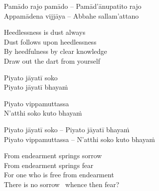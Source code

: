 \begin{verses}
  Pamādo rajo pamādo – Pamād'ānupatito rajo\\
  Appamādena vijjāya – Abbahe sallam'attano
\end{verses}

\fi

\begin{english-verses}
  Heedlessness is dust always\\
  Dust follows upon heedlessness\makeatletter\hyperlink{endnote42-appendix}\makeatother\\
  By heedfulness by clear knowledge\\
  Draw out the dart from yourself
\end{english-verses}

\suttaRef{[Snp 333-336]}

\ifninebythirteen

\begin{pali-hang-verses}
  Piyato jāyatī soko\\
  Piyato jāyatī bhayaṁ
\end{pali-hang-verses}
\begin{pali-hang-together}
  Piyato vippamuttassa\\
  N'atthi soko kuto bhayaṁ
\end{pali-hang-together}

\else

\begin{verses}
  Piyato jāyatī soko – Piyato jāyatī bhayaṁ\\
  Piyato vippamuttassa – N'atthi soko kuto bhayaṁ
\end{verses}

\fi

\begin{english-verses}
  From endearment springs sorrow\\
  From endearment springs fear\\
  For one who is free from endearment\\
  There is no sorrow \breathmark\ whence then fear?
\end{english-verses}

